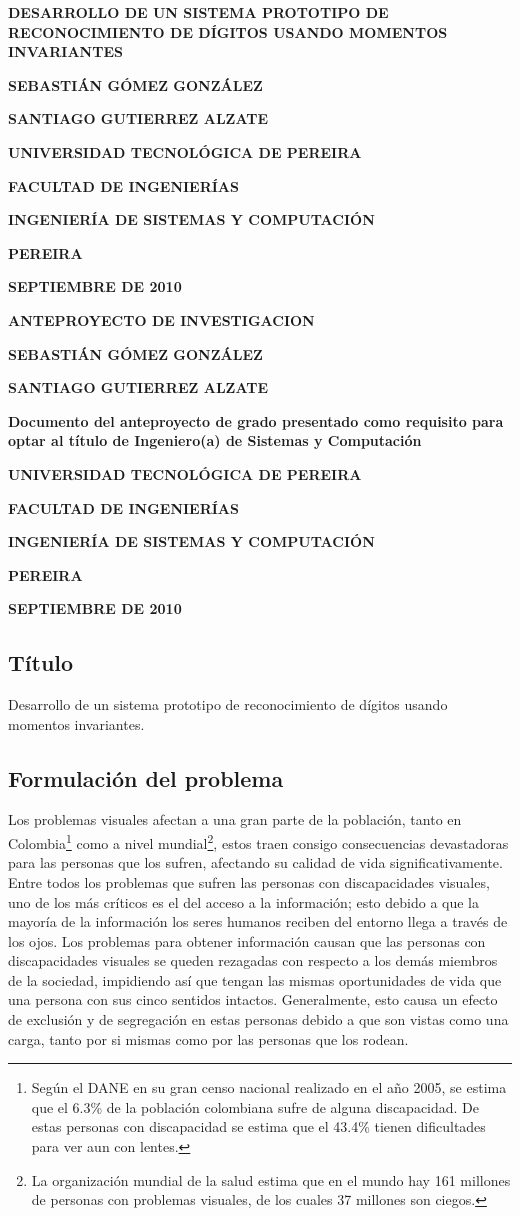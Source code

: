 \documentclass[a4paper, 11pt, oneside]{article}
\newcommand\portada{
	\begin{titlepage}
		\begin{center}
			{\large \bf DESARROLLO DE UN SISTEMA PROTOTIPO DE RECONOCIMIENTO DE DÍGITOS USANDO MOMENTOS INVARIANTES }
			\vfill
			{\large\bf SEBASTIÁN GÓMEZ GONZÁLEZ \par}
			{\large\bf SANTIAGO GUTIERREZ ALZATE \par}
			\vfill
			{\large\bf UNIVERSIDAD TECNOLÓGICA DE PEREIRA  \par}
			{\large\bf FACULTAD DE INGENIERÍAS \par}
			{\large\bf INGENIERÍA DE SISTEMAS Y COMPUTACIÓN \par}
			{\large\bf PEREIRA\par}
			{\large\bf SEPTIEMBRE DE 2010 \par}
		\end{center}
	\end{titlepage}
}
\newcommand\contraportada{
	\begin{titlepage}
		\begin{center}
			{\large \bf ANTEPROYECTO DE INVESTIGACION }
			\vfill
			{\large\bf SEBASTIÁN GÓMEZ GONZÁLEZ \par}
			{\large\bf SANTIAGO GUTIERREZ ALZATE \par}
			\vfill
			{\large\bf Documento del anteproyecto de grado presentado como requisito para optar al título de Ingeniero(a) de Sistemas y Computación\par}
			\vfill
			{\large\bf UNIVERSIDAD TECNOLÓGICA DE PEREIRA  \par}
			{\large\bf FACULTAD DE INGENIERÍAS \par}
			{\large\bf INGENIERÍA DE SISTEMAS Y COMPUTACIÓN \par}
			{\large\bf PEREIRA\par}
			{\large\bf SEPTIEMBRE DE 2010 \par}
		\end{center}
	\end{titlepage}
}
\begin{document}
\portada
\contraportada

	\tableofcontents

	\clearpage
	\begin{center}
	\section{Título}
	\end{center}
	Desarrollo de un sistema prototipo de reconocimiento de dígitos usando momentos invariantes.
	\clearpage
	
	\begin{center}
	\section{Formulación del problema}
	\end{center}

	Los problemas visuales afectan a una gran parte de la población, tanto en Colombia\footnote{Según el DANE en su gran censo nacional realizado en el año 2005, se estima que el 6.3\% de la población colombiana sufre de alguna discapacidad. De estas personas con discapacidad se estima que el 43.4\% tienen dificultades para ver aun con lentes.} como a nivel mundial\footnote{La organización mundial de la salud estima que en el mundo hay 161 millones de personas con problemas visuales, de los cuales 37 millones son ciegos.}, estos traen consigo consecuencias devastadoras para las personas que los sufren, afectando su calidad de vida significativamente. Entre todos los problemas que sufren las personas con discapacidades visuales, uno de los más críticos es el del acceso a la información; esto debido a que la mayoría de la información los seres humanos reciben del entorno llega a través de los ojos. Los problemas para obtener información causan que las personas con discapacidades visuales se queden rezagadas con respecto a los demás miembros de la sociedad, impidiendo así que tengan las mismas oportunidades de vida que una persona con sus cinco sentidos intactos. Generalmente, esto causa un efecto de exclusión y de segregación en estas personas debido a que son vistas como una carga, tanto por si mismas como por las personas que los rodean. 
\end{document}
